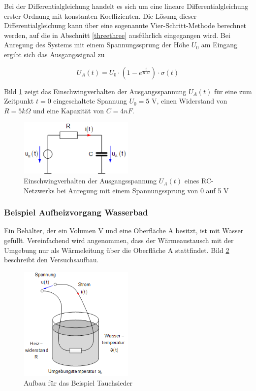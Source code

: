\noindent Bei der Differentialgleichung handelt es sich um eine lineare Differentialgleichung erster Ordnung mit konstanten Koeffizienten. Die Lösung dieser Differentialgleichung kann über eine sogenannte Vier-Schritt-Methode berechnet werden, auf die in Abschnitt \ref{threethree} ausführlich eingegangen wird. Bei Anregung des Systems mit einem Spannungssprung der Höhe $U_{0}$ am Eingang ergibt sich das Ausgangssignal zu

\begin{equation}\label{eq:threeseven}
U_{A}(t) = U_{0}\cdot (1-e^{\frac{t}{R\cdot C}})\cdot \sigma (t)
\end{equation}

\noindent Bild \ref{fig:RCEinschwingung} zeigt das Einschwingverhalten der Ausgangsspannung $U_{A}(t)$ für eine zum Zeitpunkt $t=0$ eingeschaltete Spannung $U_{0}= 5$ V, einen Widerstand von $R=5k\Omega$ und eine Kapazität von $C=4nF$.

\begin{figure}[ht]
  \centerline{\includegraphics[width=0.5\textwidth]{Kapitel2/Bilder/image2}}
  \caption{Einschwingverhalten der Ausgangsspannung $U_{A}(t)$ eines RC-Netzwerks bei Anregung mit einem Spannungssprung von 0 auf 5 V}
  \label{fig:RCEinschwingung}
\end{figure}



\subsubsection{Beispiel Aufheizvorgang Wasserbad}
Ein Behälter, der ein Volumen V und eine Oberfläche A besitzt, ist mit Wasser gefüllt. Vereinfachend
wird angenommen, dass der Wärmeaustausch mit der Umgebung nur als Wärmeleitung über die Oberfläche
A stattfindet. Bild \ref{fig:RCEinschwingungBeispiel} beschreibt den Versuchsaufbau.

\begin{figure}[H]
  \centerline{\includegraphics[width=0.5\textwidth]{Kapitel2/Bilder/image4}}
  \caption{Aufbau für das Beispiel Tauchsieder}
  \label{fig:RCEinschwingungBeispiel}
\end{figure}

